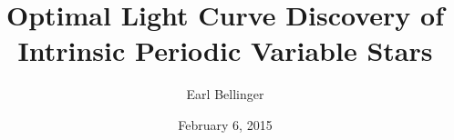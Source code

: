 \documentclass[serif,mathserif,professionalfont]{beamer}
\title[Light Curve Modeling of Periodic Variables]{Optimal Light Curve Discovery of \\Intrinsic Periodic Variable Stars}
\author{Earl Bellinger}
\institute{}
\date{February 6, 2015}
\begin{document}

\begin{frame}
  \titlepage
\end{frame}
\end{document}
